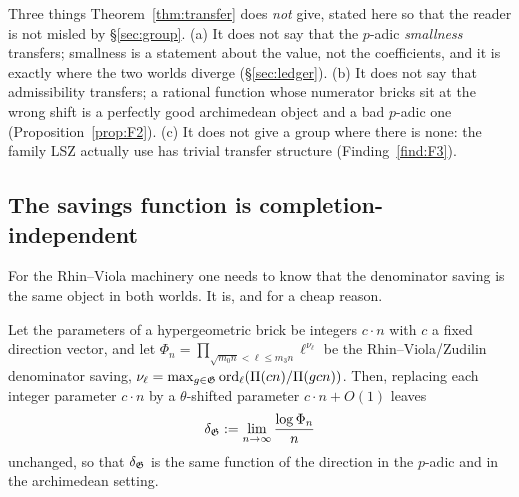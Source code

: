 \begin{remark}\label{rem:whatitdoesnotgive}
Three things Theorem~\ref{thm:transfer} does \emph{not} give, stated here so that the reader
is not misled by \S\ref{sec:group}. (a) It does not say that the $p$-adic \emph{smallness}
transfers; smallness is a statement about the value, not the coefficients, and it is exactly
where the two worlds diverge (\S\ref{sec:ledger}). (b) It does not say that admissibility
transfers; a rational function whose numerator bricks sit at the wrong shift is a perfectly
good archimedean object and a bad $p$-adic one (Proposition~\ref{prop:F2}). (c) It does not
give a group where there is none: the family LSZ actually use has trivial transfer structure
(Finding~\ref{find:F3}).
\end{remark}

\subsection{The savings function is completion-independent}\label{ss:deltainsens}

For the Rhin--Viola machinery one needs to know that the denominator saving is the same
object in both worlds. It is, and for a cheap reason.

\begin{proposition}\label{prop:deltainsens}
\DERIVED{} Let the parameters of a hypergeometric brick be integers $c\cdot n$ with $c$ a
fixed direction vector, and let $\Phi_n=\prod_{\sqrt{m_0n}<\ell\le m_3n}\ell^{\nu_\ell}$ be
the Rhin--Viola/Zudilin denominator saving, $\nu_\ell=\max_{g\in\mathfrak{G}}\operatorname{ord}_\ell(\Pi(cn)/\Pi(gcn))$.
Then, replacing each integer parameter $c\cdot n$ by a $\theta$-shifted parameter
$c\cdot n+O(1)$ leaves
\[
 \delta_{\mathfrak{G}}:=\lim_{n\to\infty}\frac{\log\Phi_n}{n}
\]
unchanged, so that $\delta_{\mathfrak{G}}$ is the same function of the direction in the $p$-adic and in the
archimedean setting.
\end{proposition}


